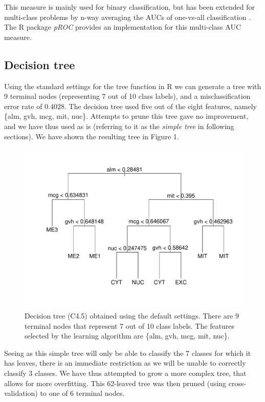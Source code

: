 \documentclass{article}
\begin{document}
This measure is mainly used for binary classification, but has been extended for multi-class problems by n-way averaging the AUCs of one-vs-all classification \cite{hand2001simple}. The R package \textit{pROC}\cite{procR} provides an implementation for this multi-class AUC measure.  

\subsection{Decision tree}

Using the standard settings for the tree function in R we can generate a tree with 9 terminal nodes (representing 7 out of 10 class labels), and a misclassification error rate of $0.4028$. The decision tree used five out of the eight features, namely  \{alm, gvh, mcg, mit, nuc\}. Attempts to prune this tree gave no improvement, and we have thus used as is (referring to it as the \textit{simple tree} in following sections). We have shown the resulting tree in Figure 1.

\begin{figure}[htbp]
\begin{center}
  \includegraphics[width=.45\linewidth]{figures/simple-tree.pdf}
\caption{Decision tree (C4.5) obtained using the default settings. There are 9 terminal nodes that represent 7 out of 10 class labels. The features selected by the learning algorithm are  \{alm, gvh, mcg, mit, nuc\}.}
\label{default}
\end{center}
\end{figure}


Seeing as this simple tree will only be able to classify the 7 classes for which it has leaves, there is an immediate restriction as we will be unable to correctly classify 3 classes. We have thus attempted to grow a more complex tree, that allows for more overfitting. This 62-leaved tree was then pruned (using cross-validation) to one of 6 terminal nodes.
\end{document}
